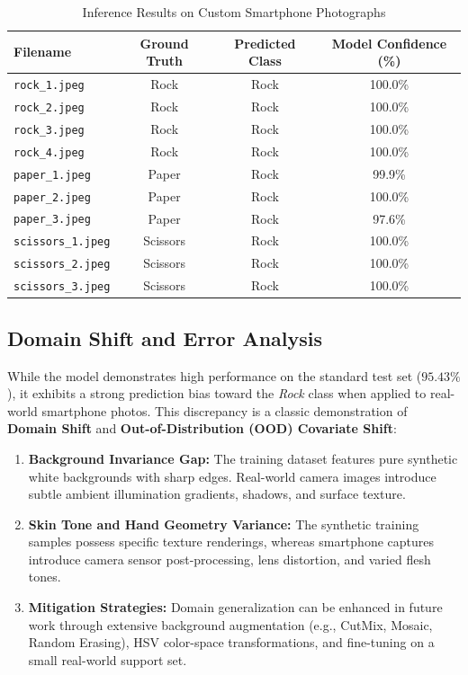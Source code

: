 \documentclass[11pt,a4paper]{article}
\begin{document}
\begin{table}[h!]
\centering
\small
\caption{Inference Results on Custom Smartphone Photographs}
\label{tab:custom_pred}
\begin{tabular}{@{}lccc@{}}
\toprule
\textbf{Filename} & \textbf{Ground Truth} & \textbf{Predicted Class} & \textbf{Model Confidence (\%)} \\ \midrule
\texttt{rock\_1.jpeg} & Rock & Rock & 100.0\% \\
\texttt{rock\_2.jpeg} & Rock & Rock & 100.0\% \\
\texttt{rock\_3.jpeg} & Rock & Rock & 100.0\% \\
\texttt{rock\_4.jpeg} & Rock & Rock & 100.0\% \\
\texttt{paper\_1.jpeg} & Paper & Rock & 99.9\% \\
\texttt{paper\_2.jpeg} & Paper & Rock & 100.0\% \\
\texttt{paper\_3.jpeg} & Paper & Rock & 97.6\% \\
\texttt{scissors\_1.jpeg} & Scissors & Rock & 100.0\% \\
\texttt{scissors\_2.jpeg} & Scissors & Rock & 100.0\% \\
\texttt{scissors\_3.jpeg} & Scissors & Rock & 100.0\% \\ \bottomrule
\end{tabular}
\end{table}

\subsection{Domain Shift and Error Analysis}
While the model demonstrates high performance on the standard test set ($95.43\%$), it exhibits a strong prediction bias toward the \textit{Rock} class when applied to real-world smartphone photos. This discrepancy is a classic demonstration of \textbf{Domain Shift} and \textbf{Out-of-Distribution (OOD) Covariate Shift}:
\begin{enumerate}[leftmargin=1.5em, itemsep=2pt]
    \item \textbf{Background Invariance Gap:} The training dataset features pure synthetic white backgrounds with sharp edges. Real-world camera images introduce subtle ambient illumination gradients, shadows, and surface texture.
    \item \textbf{Skin Tone and Hand Geometry Variance:} The synthetic training samples possess specific texture renderings, whereas smartphone captures introduce camera sensor post-processing, lens distortion, and varied flesh tones.
    \item \textbf{Mitigation Strategies:} Domain generalization can be enhanced in future work through extensive background augmentation (e.g., CutMix, Mosaic, Random Erasing), HSV color-space transformations, and fine-tuning on a small real-world support set.
\end{enumerate}
\end{document}
